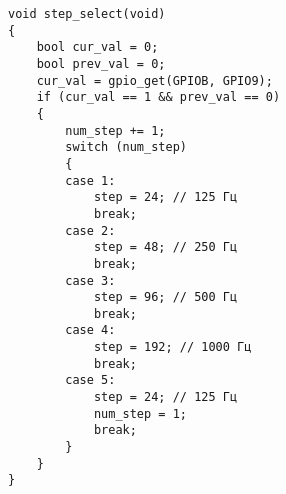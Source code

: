 \begin{code}
\begin{verbatim}
void step_select(void)
{
    bool cur_val = 0;
    bool prev_val = 0;
    cur_val = gpio_get(GPIOB, GPIO9);
    if (cur_val == 1 && prev_val == 0)
    {
        num_step += 1;
        switch (num_step)
        {
        case 1:
            step = 24; // 125 Гц
            break;
        case 2:
            step = 48; // 250 Гц
            break;
        case 3:
            step = 96; // 500 Гц
            break;
        case 4:
            step = 192; // 1000 Гц
            break;
        case 5:
            step = 24; // 125 Гц
            num_step = 1;
            break;
        }
    }
}
\end{verbatim}
\end{code}

